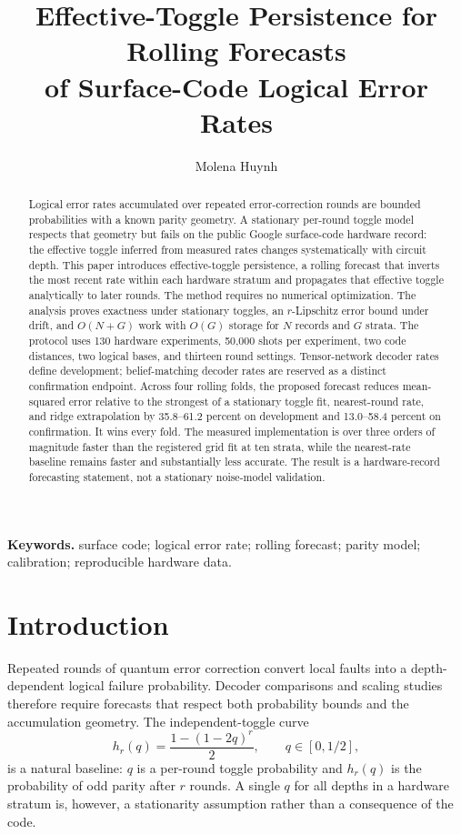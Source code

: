 \documentclass[10pt,letterpaper,twoside]{article}
\begin{document}
\title{Effective-Toggle Persistence for Rolling Forecasts\\
of Surface-Code Logical Error Rates}
\author{Molena Huynh}
\date{}
\maketitle

\begin{abstract}
Logical error rates accumulated over repeated error-correction rounds are
bounded probabilities with a known parity geometry. A stationary per-round
toggle model respects that geometry but fails on the public Google surface-code
hardware record: the effective toggle inferred from measured rates changes
systematically with circuit depth. This paper introduces effective-toggle
persistence, a rolling forecast that inverts the most recent rate within each
hardware stratum and propagates that effective toggle analytically to later
rounds. The method requires no numerical optimization. The analysis proves
exactness under stationary toggles, an $r$-Lipschitz error bound under drift,
and $O(N+G)$ work with $O(G)$ storage for $N$ records and $G$ strata. The
protocol uses 130 hardware experiments, 50,000 shots per experiment, two code
distances, two logical bases, and thirteen round settings. Tensor-network
decoder rates define development; belief-matching decoder rates are reserved
as a distinct confirmation endpoint. Across four rolling folds, the proposed
forecast reduces mean-squared error relative to the strongest of a stationary
toggle fit, nearest-round rate, and ridge extrapolation by 35.8--61.2 percent
on development and 13.0--58.4 percent on confirmation. It wins every fold.
The measured implementation is over three orders of magnitude faster than the
registered grid fit at ten strata, while the nearest-rate baseline remains
faster and substantially less accurate. The result is a hardware-record
forecasting statement, not a stationary noise-model validation.
\end{abstract}

\noindent\textbf{Keywords.} surface code; logical error rate; rolling forecast;
parity model; calibration; reproducible hardware data.

\section{Introduction}

Repeated rounds of quantum error correction convert local faults into a
depth-dependent logical failure probability. Decoder comparisons and scaling
studies therefore require forecasts that respect both probability bounds and
the accumulation geometry. The independent-toggle curve
\begin{equation}
 h_r(q)=\frac{1-(1-2q)^r}{2},\qquad q\in[0,1/2],
 \label{eq:toggle}
\end{equation}
is a natural baseline: $q$ is a per-round toggle probability and $h_r(q)$ is
the probability of odd parity after $r$ rounds. A single $q$ for all depths in
a hardware stratum is, however, a stationarity assumption rather than a
consequence of the code.
\end{document}
